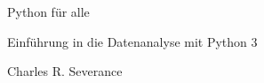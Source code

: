\begin{titlepage}
\begin{center}
\vspace*{30mm}

\sffamily
\LARGE
Python für alle

\lARGE
Einführung in die Datenanalyse mit Python 3

\vspace{15mm}

\large
Charles R. Severance
\end{center}
\end{titlepage}

\normalsize
\normalfont

